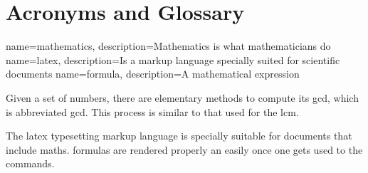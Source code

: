 \section{Acronyms and Glossary}
{
    name=mathematics,
    description={Mathematics is what mathematicians do}
}
{
    name=latex,
    description={Is a markup language specially suited for 
scientific documents}
}
{
    name=formula,
    description={A mathematical expression}
}

Given a set of numbers, there are elementary methods to compute 
its \acrlong{gcd}, which is abbreviated \acrshort{gcd}. This process 
is similar to that used for the \acrfull{lcm}.

The \Gls{latex} typesetting markup language is specially suitable 
for documents that include \gls{maths}. \Glspl{formula} are rendered 
properly an easily once one gets used to the commands.